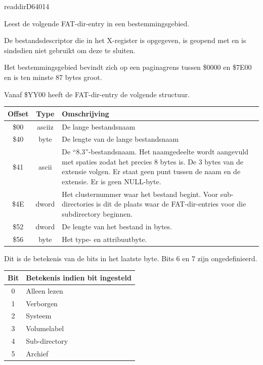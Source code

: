 \newpage
\begin{hyppotrap}{readdir}{D640}{14}

\item [Dienst:]  Leest de volgende FAT-dir-entry in een bestemmingsgebied.
\item [Voorwaarden:]  De bestandsdescriptor die in het X-register is opgegeven, is geopend met  en  is sindsdien niet gebruikt om deze te sluiten.

  Het bestemmingsgebied bevindt zich op een paginagrens tussen \$0000 en \$7E00 en is  ten minste 87 bytes groot.
\item [Invoer:]    
\item [Resultaten:]
  \raggedright Vanaf \$YY00 heeft de FAT-dir-entry de volgende structuur.  {\setlength{\tabcolsep}{2mm}
  \begin{tabular}{|c|c|p{6.9cm}|}
  \hline
  \textbf{Offset} & \textbf{Type} & \textbf{Omschrijving}
  \\\hline
  \$00 & asciiz & De lange bestandsnaam
  \\
  \$40 & byte & De lengte van de lange bestandsnaam
  \\
  \$41 & ascii & De ``8.3''-bestandsnaam. Het naamgedeelte wordt aangevuld met spaties zodat  het precies 8 bytes is. De 3 bytes van de extensie volgen. Er staat  geen punt tussen de naam en de extensie. Er is geen NULL-byte.
  \\
  \$4E & dword & Het clusternummer waar het bestand begint. Voor sub-directories  is dit de plaats waar de FAT-dir-entries voor die subdirectory beginnen.
  \\
  \$52 & dword & De lengte van het bestand in bytes.
  \\
  \$56 & byte  & Het type- en attribuutbyte.
  \\\hline
  \end{tabular}
  }

  Dit is de betekenis van de bits in het laatste byte. Bits 6 en 7 zijn ongedefinieerd.  {\setlength{\tabcolsep}{2mm}
  \begin{tabular}{|c|l|}
  \hline
  \textbf{Bit} & \textbf{Betekenis indien bit ingesteld} \\
  \hline
  0 & Alleen lezen         \\  1 & Verborgen            \\  2 & Systeem            \\  3 & Volumelabel      \\  4 & Sub-directory     \\  5 & Archief           \\
  \hline
  \end{tabular}
  }


\end{hyppotrap}
